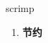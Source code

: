 
\begin{frame}
{\huge scrimp}
\begin{center}
\begin{enumerate}\Large
  \item \textbf{节约}
\end{enumerate}
\end{center}
\end{frame}
